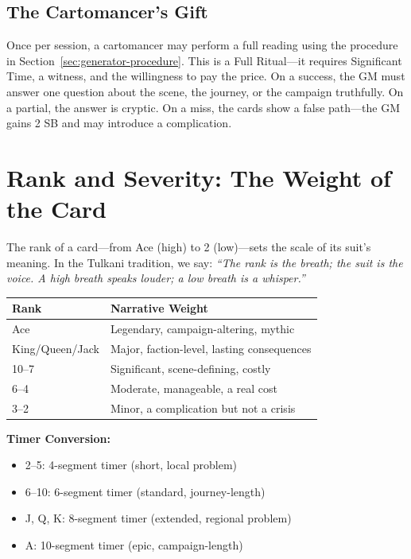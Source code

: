 \documentclass[12pt,oneside]{book}
\begin{document}
\subsection*{The Cartomancer's Gift}

Once per session, a cartomancer may perform a full reading using the procedure in Section~\ref{sec:generator-procedure}. This is a Full Ritual---it requires Significant Time, a witness, and the willingness to pay the price. On a success, the GM must answer one question about the scene, the journey, or the campaign truthfully. On a partial, the answer is cryptic. On a miss, the cards show a false path---the GM gains 2 SB and may introduce a complication.

\section*{Rank and Severity: The Weight of the Card}

The rank of a card---from Ace (high) to 2 (low)---sets the scale of its suit's meaning. In the Tulkani tradition, we say: \textit{``The rank is the breath; the suit is the voice. A high breath speaks louder; a low breath is a whisper.''}

\begin{center}
\begin{tabular}{|l|l|}
\hline
\textbf{Rank} & \textbf{Narrative Weight} \\
\hline
Ace & Legendary, campaign-altering, mythic \\
King/Queen/Jack & Major, faction-level, lasting consequences \\
10--7 & Significant, scene-defining, costly \\
6--4 & Moderate, manageable, a real cost \\
3--2 & Minor, a complication but not a crisis \\
\hline
\end{tabular}
\end{center}

\noindent
\textbf{Timer Conversion:}
\begin{itemize}
    \item 2--5: 4-segment timer (short, local problem)
    \item 6--10: 6-segment timer (standard, journey-length)
    \item J, Q, K: 8-segment timer (extended, regional problem)
    \item A: 10-segment timer (epic, campaign-length)
\end{itemize}
\end{document}
